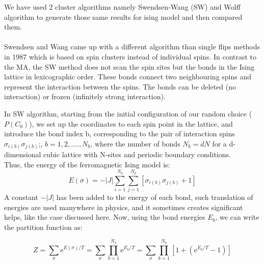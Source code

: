 \documentclass[a4paper,8pt]{article}
\begin{document}
We have used 2 cluster algorithms namely Swendsen-Wang (SW) and Wolff algorithm to generate those same results for ising model and then compared them. \\

 \\

Swendsen and Wang came up with a different algorithm than single flips methods in 1987 which is based on spin clusters instead of individual spins. In contrast to the MA, the SW method does not scan the spin sites but the bonds in the Ising lattice in lexicographic order. These bonds connect
two neighbouring spins and represent the interaction between the spins. The bonds can be deleted (no interaction) or frozen (infinitely strong interaction).  

In SW algorithm, starting from the initial configuration of our random choice ($P(C_0)$), we set up the coordinates to each spin point in the lattice, and introduce the bond index b, corresponding to the pair of interaction spins $\sigma_{i(b)} \sigma_{j(b)}$;, $b = 1,2,...., N_{b}$, where the number of bonds $N_b = dN$ for a d-dimensional cubic lattice with N-sites and periodic boundary conditions. \\

Thus, the energy of the ferromagnetic Ising model is:
\begin{equation}
    E(\sigma) = -|J| \sum\limits_{i=1}^{N_b} \sum\limits_{j=1}^{N_b} [\sigma_{i(b)} \sigma_{j(b)} + 1]  \label{eq:energy}
\end{equation}
A constant $-|J|$ has been added to the energy of each bond, such translation of energies are used manywhere in physics, and it sometimes creates significant helps, like the case discussed here. Now, using the bond energies $E_b$, we can write the partition function as:

\begin{equation}
    Z =  \sum\limits_{\sigma} \mathrm{e}^{E(\sigma)/T} = \sum_{\sigma} \prod_{b=1}^{N_b} \mathrm{e}^{{E_b}/{T}} = \sum_{\sigma} \prod_{b=1}^{N_b} \left[1 + \left(\mathrm{e}^{{E_b}/{T}} - 1\right)\right]
\end{equation}
\end{document}
